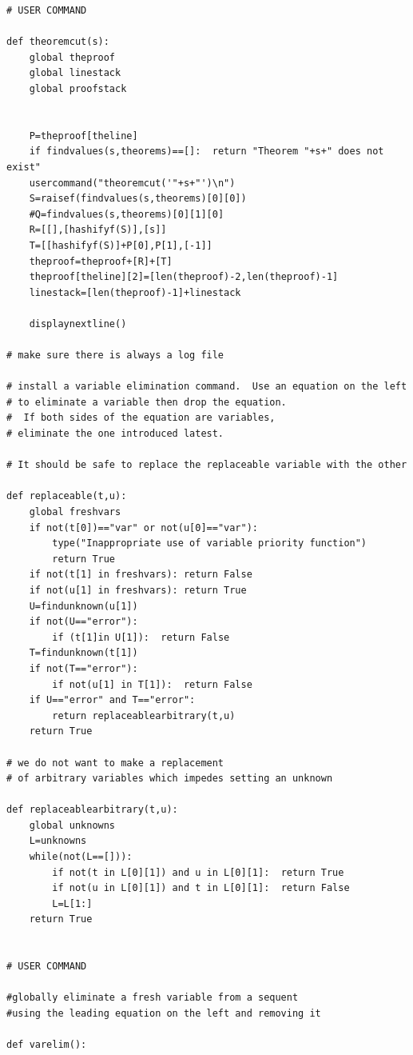 \documentclass{article}
\begin{document}
\begin{verbatim}
# USER COMMAND

def theoremcut(s):
    global theproof
    global linestack
    global proofstack

    
    P=theproof[theline]
    if findvalues(s,theorems)==[]:  return "Theorem "+s+" does not exist"
    usercommand("theoremcut('"+s+"')\n")
    S=raisef(findvalues(s,theorems)[0][0])
    #Q=findvalues(s,theorems)[0][1][0]
    R=[[],[hashifyf(S)],[s]]
    T=[[hashifyf(S)]+P[0],P[1],[-1]]
    theproof=theproof+[R]+[T]
    theproof[theline][2]=[len(theproof)-2,len(theproof)-1]
    linestack=[len(theproof)-1]+linestack
    
    displaynextline()

# make sure there is always a log file

# install a variable elimination command.  Use an equation on the left
# to eliminate a variable then drop the equation.  
#  If both sides of the equation are variables,
# eliminate the one introduced latest.

# It should be safe to replace the replaceable variable with the other

def replaceable(t,u):
    global freshvars
    if not(t[0])=="var" or not(u[0]=="var"):
        type("Inappropriate use of variable priority function")
        return True
    if not(t[1] in freshvars): return False
    if not(u[1] in freshvars): return True
    U=findunknown(u[1])
    if not(U=="error"):
        if (t[1]in U[1]):  return False
    T=findunknown(t[1])
    if not(T=="error"):
        if not(u[1] in T[1]):  return False
    if U=="error" and T=="error":
        return replaceablearbitrary(t,u)
    return True

# we do not want to make a replacement 
# of arbitrary variables which impedes setting an unknown

def replaceablearbitrary(t,u):
    global unknowns
    L=unknowns
    while(not(L==[])):
        if not(t in L[0][1]) and u in L[0][1]:  return True
        if not(u in L[0][1]) and t in L[0][1]:  return False
        L=L[1:]
    return True


# USER COMMAND

#globally eliminate a fresh variable from a sequent
#using the leading equation on the left and removing it

def varelim():


\end{verbatim}
\end{document}
